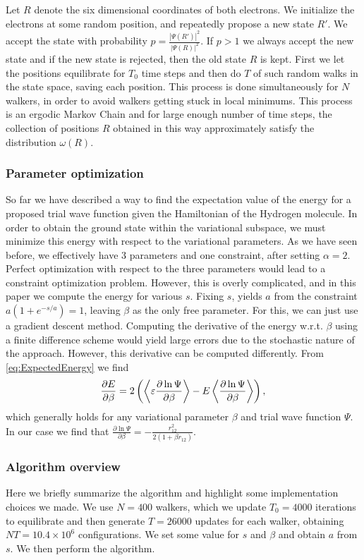 \documentclass[twoside]{article}
\begin{document}
Let $R$ denote the six dimensional coordinates of both electrons. We initialize the electrons at some random position, and repeatedly propose a new state $R'$. We accept the state with probability $p = \frac{|\Psi(R')|^2}{|\Psi(R)|^2}$. If $p > 1$ we always accept the new state and if the new state is rejected, then the old state $R$ is kept. First we let the positions equilibrate for $T_0$ time steps and then do $T$ of such random walks in the state space, saving each position. This process is done simultaneously for $N$ walkers, in order to avoid walkers getting stuck in local minimums.
This process is an ergodic Markov Chain and for large enough number of time steps, the collection of positions $R$ obtained in this way approximately satisfy the distribution $\omega(R)$.

\subsubsection*{Parameter optimization}
So far we have described a way to find the expectation value of the energy for a proposed trial wave function given the Hamiltonian of the Hydrogen molecule. In order to obtain the ground state within the variational subspace, we must minimize this energy with respect to the variational parameters. As we have seen before, we effectively have 3 parameters and one constraint, after setting $\alpha = 2$. Perfect optimization with respect to the three parameters would lead to a constraint optimization problem. However, this is overly complicated, and in this paper we compute the energy for various $s$. Fixing $s$, yields $a$ from the constraint $a(1+e^{-s/a}) = 1$, leaving $\beta$ as the only free parameter. For this, we can just use a gradient descent method. Computing the derivative of the energy w.r.t. $\beta$ using a finite difference scheme would yield large errors due to the stochastic nature of the approach. However, this derivative can be computed differently. From \eqref{eq:ExpectedEnergy} we find\cite{ref_Harju}\cite{ref_Thijssen} 
\begin{equation}
\frac{\partial E}{\partial \beta} = 2\left( \Braket{\varepsilon \frac{\partial \ln \Psi}{\partial \beta}} - E\Braket{\frac{\partial \ln \Psi}{\partial \beta}} \right),
\end{equation}
which generally holds for any variational parameter $\beta$ and trial wave function $\Psi$. In our case we find that $\frac{\partial \ln \Psi}{\partial \beta} = -\frac{r_{12}^2}{2(1+\beta r_{12})}$.

\subsubsection*{Algorithm overview}
Here we briefly summarize the algorithm and highlight some implementation choices we made. We use $N = 400$ walkers, which we update $T_0 = 4000$ iterations to equilibrate and then generate $T = 26000$ updates for each walker, obtaining $NT = 10.4 \times 10^6$ configurations. We set some value for $s$ and $\beta$ and obtain $a$ from $s$. We then perform the algorithm.
\end{document}
